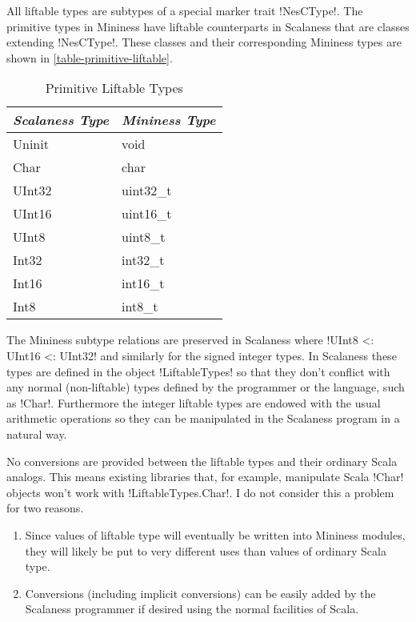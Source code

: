 All liftable types are subtypes of a special marker trait !NesCType!. The primitive types in
Mininess have liftable counterparts in Scalaness that are classes extending !NesCType!. These
classes and their corresponding Mininess types are shown in \autoref{table-primitive-liftable}.

\begin{table}
  \centering
  \caption{Primitive Liftable Types}
  \label{table-primitive-liftable}
  \begin{tabular}{|l|l|} \hline
    \textit{Scalaness Type} & \textit{Mininess Type} \\ \hline
    Uninit & void      \\ \hline
    Char   & char      \\ \hline
    UInt32 & uint32\_t \\ \hline
    UInt16 & uint16\_t \\ \hline
    UInt8  & uint8\_t  \\ \hline
    Int32  & int32\_t  \\ \hline
    Int16  & int16\_t  \\ \hline
    Int8   & int8\_t   \\ \hline
  \end{tabular}
\end{table}

The Mininess subtype relations are preserved in Scalaness where !UInt8 <: UInt16 <: UInt32! and
similarly for the signed integer types. In Scalaness these types are defined in the object
!LiftableTypes! so that they don't conflict with any normal (non-liftable) types defined by the
programmer or the language, such as !Char!. Furthermore the integer liftable types are endowed
with the usual arithmetic operations so they can be manipulated in the Scalaness program in a
natural way.

No conversions are provided between the liftable types and their ordinary Scala analogs. This
means existing libraries that, for example, manipulate Scala !Char! objects won't work with
!LiftableTypes.Char!. I do not consider this a problem for two reasons.
\begin{enumerate}
\item Since values of liftable type will eventually be written into Mininess modules, they will
  likely be put to very different uses than values of ordinary Scala type.
\item Conversions (including implicit conversions) can be easily added by the Scalaness
  programmer if desired using the normal facilities of Scala.
\end{enumerate}

